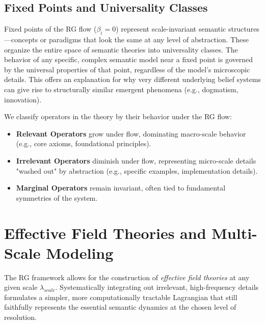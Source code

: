 
\subsection{Fixed Points and Universality Classes}
\label{15.3.1:fixed_points_and_universality_classes}

Fixed points of the RG flow (\(\beta_i = 0\)) represent scale-invariant semantic structures—concepts or paradigms that look the same at any level of abstraction. These organize the entire space of semantic theories into universality classes. The behavior of any specific, complex semantic model near a fixed point is governed by the universal properties of that point, regardless of the model's microscopic details. This offers an explanation for why very different underlying belief systems can give rise to structurally similar emergent phenomena (e.g., dogmatism, innovation).

We classify operators in the theory by their behavior under the RG flow:

\begin{itemize}

    \item \textbf{Relevant Operators} grow under flow, dominating macro-scale behavior (e.g., core axioms, foundational principles).

    \item \textbf{Irrelevant Operators} diminish under flow, representing micro-scale details "washed out" by abstraction (e.g., specific examples, implementation details).

    \item \textbf{Marginal Operators} remain invariant, often tied to fundamental symmetries of the system.

\end{itemize}


\section{Effective Field Theories and Multi-Scale Modeling}
\label{15.4:effective_field_theories_and_multi_scale_modeling}

The RG framework allows for the construction of \textit{effective field theories} at any given scale \(\lambda_{scale}\). Systematically integrating out irrelevant, high-frequency details formulates a simpler, more computationally tractable Lagrangian that still faithfully represents the essential semantic dynamics at the chosen level of resolution.

